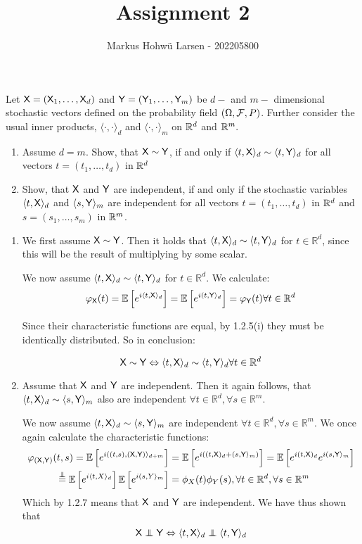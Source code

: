 \documentclass{Class}
\title{Assignment 2}
\author{Markus Hohwü Larsen - 202205800}
\begin{document}
Let $\mathsf{X}=(\mathsf{X}_1,\dots, \mathsf{X}_d)$ and $\mathsf{Y}=(\mathsf{Y}_1,\dots,\mathsf{Y}_m)$ be $d-$ and $m-$ dimensional stochastic vectors defined on the probability field $(\Omega, \mathcal{F}, P)$. Further consider the usual inner products, $\langle\cdot,\cdot\rangle_d$ and $\langle\cdot,\cdot\rangle_m$ on $\mathbb{R}^d$ and $\mathbb{R}^m.$
\begin{enumerate}
    \item Assume $d=m$. Show, that $\mathsf{X}\sim\mathsf{Y}$, if and only if $\langle t,\mathsf{X}\rangle_d\sim\langle t,\mathsf{Y}\rangle_d$ for all vectors $t=(t_1,\dots, t_d)$ in $\mathbb{R}^d$
    \item Show, that $\mathsf{X}$ and $\mathsf{Y}$ are independent, if and only if the stochastic variables $\langle t,\mathsf{X}\rangle_d$ and $\langle s,\mathsf{Y}\rangle_m$ are independent for all vectors $t=(t_1,\dots, t_d)$ in $\mathbb{R}^d$ and $s=(s_1,\dots,s_m)$ in $\mathbb{R}^m$.
\end{enumerate}
\solution
\begin{enumerate}
    \item We first assume $\mathsf{X} \sim \mathsf{Y}$. Then it holds that $\langle t, \mathsf{X}\rangle_d \sim\langle t, \mathsf{Y}\rangle_d$ for $t \in \mathbb{R}^d$, since this will be the result of multiplying by some scalar.

    We now assume $\langle t, \mathsf{X}\rangle_d \sim\langle t, \mathsf{Y}\rangle_d$ for $t \in \mathbb{R}^d$. We calculate:
    $$
    \varphi_{\mathsf{X}}(t)=\mathbb{E}\left[e^{i\langle t, \mathsf{X}\rangle_d}\right]=\mathbb{E}\left[e^{i(t, \mathsf{Y}\rangle_d}\right]=\varphi_{\mathsf{Y}}(t) \forall t \in \mathbb{R}^d
    $$
    
    
    Since their characteristic functions are equal, by 1.2.5(i) they must be identically distributed. So in conclusion:
    
    $$
    \mathsf{X} \sim \mathsf{Y} \Leftrightarrow\langle t, \mathsf{X}\rangle_d \sim\langle t, \mathsf{Y}\rangle_d \forall t \in \mathbb{R}^d
    $$
    \item Assume that $\mathsf{X}$ and $\mathsf{Y}$ are independent. Then it again follows, that $\langle t, \mathsf{X}\rangle_d \sim\langle s, \mathsf{Y}\rangle_m$ also are independent $\forall t \in \mathbb{R}^d, \forall s \in \mathbb{R}^m$.

    We now assume $\langle t, \mathsf{X}\rangle_d \sim\langle s, \mathsf{Y}\rangle_m$ are independent $\forall t \in \mathbb{R}^d, \forall s \in \mathbb{R}^m$. We once again calculate the characteristic functions: 
    $$
    \begin{aligned}
    \varphi_{(\X, \Y)}(t, s)=\mathbb{E}\left[e^{i((t, s),(\X, \Y)\rangle_{d+m}}\right] & =\mathbb{E}\left[e^{i\left((t, \X)_d+(s, \Y\rangle_m\right)}\right]=\mathbb{E}\left[e^{i(t, \X)_d} e^{i(s, \Y\rangle_m}\right] \\
    \stackrel{\independent}{=} \mathbb{E}\left[e^{i\langle t, X\rangle_d}\right] \mathbb{E}\left[e^{i(s, Y\rangle_m}\right] & =\phi_X(t) \phi_Y(s), \forall t \in \mathbb{R}^d, \forall s \in \mathbb{R}^m
    \end{aligned}
    $$ Which by 1.2.7 means that $\mathsf{X}$ and $\mathsf{Y}$ are independent. We have thus shown that
    $$
    \X \independent \Y \Leftrightarrow\langle t, \X\rangle_d \independent\langle t, \Y\rangle_d
    $$
    
\end{enumerate}
\end{document}

